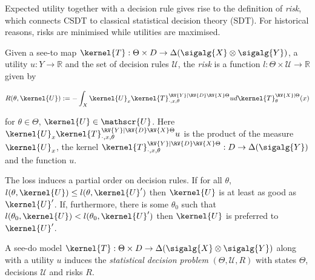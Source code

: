 Expected utility together with a decision rule gives rise to the definition of \emph{risk}, which connects CSDT to classical statistical decision theory (SDT). For historical reasons, risks are minimised while utilities are maximised.

\begin{definition}[Risk]
Given a see-to map $\kernel{T}:\Theta\times D\to \Delta(\sigalg{X}\otimes\sigalg{Y})$, a utility $u:Y\to \mathbb{R}$ and the set of decision rules $\mathscr{U}$, the \emph{risk} is a function $l:\Theta\times \mathscr{U}\to \mathbb{R}$ given by

\begin{align}
    R(\theta,\kernel{U}) := - \int_X  \kernel{U}_x \kernel{T}^{\RV{Y}|\RV{D}\RV{X}\Theta}_{\cdot,x,\theta} u d\kernel{T}^{\RV{X}|\Theta}_\theta(x)
\end{align}

for $\theta\in \Theta$, $\kernel{U}\in \mathscr{U}$. Here $\kernel{U}_x \kernel{T}^{\RV{Y}|\RV{D}\RV{X}\Theta}_{\cdot,x,\theta} u$ is the product of the measure $\kernel{U}_x$, the kernel $\kernel{T}^{\RV{Y}|\RV{D}\RV{X}\Theta}_{\cdot,x,\theta}:D\to \Delta(\sigalg{Y})$ and the function $u$.
\end{definition}

The loss induces a partial order on decision rules. If for all $\theta$, $l(\theta,\kernel{U})\leq l(\theta,\kernel{U}')$ then $\kernel{U}$ is at least as good as $\kernel{U}'$. If, furthermore, there is some $\theta_0$ such that $l(\theta_0,\kernel{U})<l(\theta_0,\kernel{U}')$ then $\kernel{U}$ is preferred to $\kernel{U}'$.

\begin{definition}
A see-do model $\kernel{T}:\Theta\times D\to \Delta(\sigalg{X}\otimes\sigalg{Y})$ along with a utility $u$ induces the \emph{statistical decision problem} $(\Theta,\mathscr{U},R)$ with states $\Theta$, decisions $\mathscr{U}$ and risks $R$.


\end{definition}




